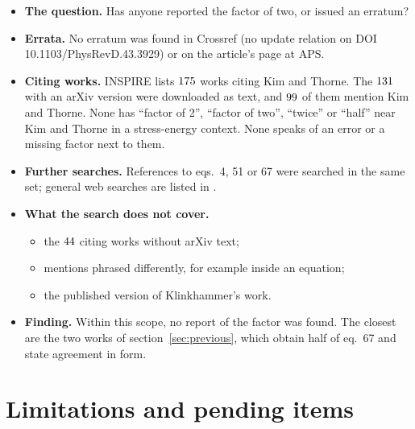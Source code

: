 \begin{itemize}
\item \textbf{The question.} Has anyone reported the factor of two, or issued an erratum?
\item \textbf{Errata.} No erratum was found in Crossref (no update relation on DOI 10.1103/PhysRevD.43.3929) or on the article's page at APS.
\item \textbf{Citing works.} INSPIRE lists $175$ works citing Kim and Thorne. The $131$ with an arXiv version were downloaded as text, and $99$ of them mention Kim and Thorne. None has ``factor of 2'', ``factor of two'', ``twice'' or ``half'' near Kim and Thorne in a stress-energy context. None speaks of an error or a missing factor next to them.
\item \textbf{Further searches.} References to eqs.~4, 51 or 67 were searched in the same set; general web searches are listed in .
\item \textbf{What the search does not cover.}
  \begin{itemize}
  \item the $44$ citing works without arXiv text;
  \item mentions phrased differently, for example inside an equation;
  \item the published version of Klinkhammer's work.
  \end{itemize}
\item \textbf{Finding.} Within this scope, no report of the factor was found. The closest are the two works of section~\ref{sec:previous}, which obtain half of eq.~67 and state agreement in form.
\end{itemize}

\section{Limitations and pending items}
\label{sec:limitations}

